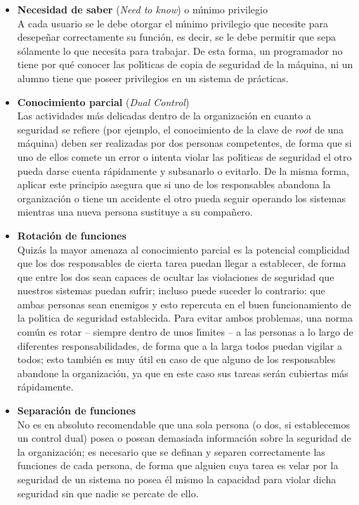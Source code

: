 \begin{itemize}
\item {\bf Necesidad de saber} ({\it Need to know}) o m\'{\i}nimo privilegio\\
A cada usuario se le debe otorgar el m\'{\i}nimo privilegio que necesite para
desepe\~nar correctamente su funci\'on, es decir, se le debe permitir que
sepa s\'olamente lo que necesita para trabajar. De esta forma, un programador
no tiene por qu\'e conocer las pol\'{\i}ticas de copia de seguridad de la
m\'aquina, ni un alumno tiene que poseer privilegios en un sistema de
pr\'acticas.
\item {\bf Conocimiento parcial} ({\it Dual Control})\\
Las actividades m\'as delicadas dentro de la organizaci\'on en cuanto a
seguridad se refiere (por ejemplo, el conocimiento de la clave de {\it root} de
una m\'aquina) deben ser realizadas por dos personas competentes, de forma que
si uno de ellos comete un error o intenta violar las pol\'{\i}ticas de
seguridad el otro pueda darse cuenta r\'apidamente y subsanarlo o evitarlo. De
la misma forma, aplicar este principio asegura que si uno de los responsables
abandona la organizaci\'on o tiene un accidente el otro pueda seguir operando
los sistemas mientras una nueva persona sustituye a su compa\~nero.
\item {\bf Rotaci\'on de funciones}\\
Quiz\'as la mayor amenaza al conocimiento parcial es la potencial complicidad que
los dos responsables de cierta tarea puedan llegar a establecer, de forma que
entre los dos sean capaces de ocultar las violaciones de seguridad que nuestros
sistemas puedan sufrir; incluso puede
suceder lo contrario: que ambas personas sean enemigos y esto repercuta en
el buen funcionamiento de la pol\'{\i}tica de seguridad establecida. Para evitar
ambos problemas, una norma com\'un es rotar -- siempre dentro de unos
l\'{\i}mites -- a las personas a lo largo de diferentes responsabilidades, de
forma que a la larga todos puedan vigilar a todos; esto tambi\'en es muy
\'util en caso de que alguno de los responsables abandone la organizaci\'on, ya
que en este caso sus tareas ser\'an cubiertas m\'as r\'apidamente.
\item {\bf Separaci\'on de funciones}\\
No es en absoluto recomendable que una sola persona (o dos, si establecemos un
control dual) posea o posean demasiada 
informaci\'on sobre la seguridad de la organizaci\'on; es necesario que se 
definan y separen correctamente las funciones de cada persona, de forma que
alguien cuya tarea es velar por la seguridad de un sistema no posea \'el mismo
la capacidad para violar dicha seguridad sin que nadie se percate de ello.
\end{itemize} 
